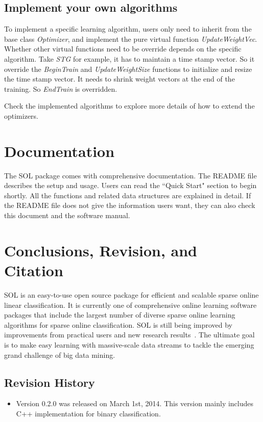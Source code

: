 \documentclass[11pt,a4paper]{article}
\newlength{\wideitemsep}
\let\olditem\item
\renewcommand{\item}{\setlength{\itemsep}{\wideitemsep}\olditem}
\begin{document}
\subsection{Implement your own algorithms}
To implement a specific learning algorithm, users only need to inherit from the
base class \emph{Optimizer}, and implement the pure virtual function
\emph{UpdateWeightVec}. Whether other virtual functions need to be override
depends on the specific algorithm. Take \emph{STG} for example, it has to
maintain a time stamp vector. So it override the \emph{BeginTrain} and
\emph{UpdateWeightSize} functions to initialize and resize the time stamp
vector. It needs to shrink weight vectors at the end of the training. So
\emph{EndTrain} is overridden.

Check the implemented algorithms to explore more details of how to extend the optimizers.

\section{Documentation}

The SOL package comes with comprehensive documentation. The README file describes the setup and usage. Users can read the ``Quick
Start" section to begin shortly. All the functions and related data structures are explained in detail. If the README file does not give the information
users want, they can also check this document and the software manual.

\newpage

\section{Conclusions, Revision, and Citation}
SOL is an easy-to-use open source package for efficient and scalable sparse
online linear classification. It is currently one of comprehensive online
learning software packages that include the largest number of diverse sparse
online learning algorithms for sparse online classification. SOL is still being improved by improvements from practical users and new research results~. The ultimate goal is to make easy learning with massive-scale data streams to tackle the emerging grand challenge of big data mining.


\subsection*{Revision History}
\begin{itemize}
    \item{Version 0.2.0} was released on March 1st, 2014. This version
        mainly includes C++ implementation for binary classification. 
\end{itemize}
\end{document}
